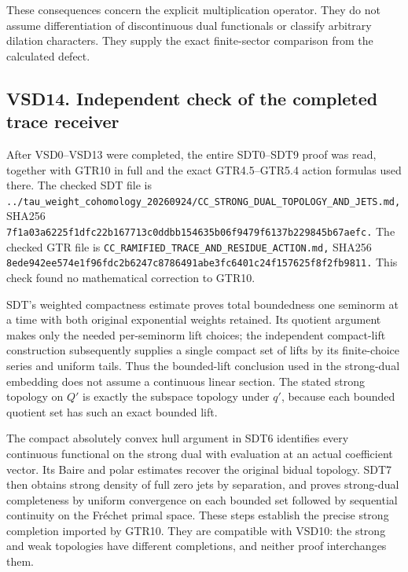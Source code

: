 These consequences concern the explicit multiplication operator. They do
not assume differentiation of discontinuous dual functionals or classify
arbitrary dilation characters. They supply the exact finite-sector
comparison from the calculated defect.

\subsection{VSD14. Independent check of the completed trace
receiver}\label{vsd14.-independent-check-of-the-completed-trace-receiver}

After VSD0--VSD13 were completed, the entire SDT0--SDT9 proof was read,
together with GTR10 in full and the exact GTR4.5--GTR5.4 action formulas
used there. The checked SDT file is
\nolinkurl{../tau_weight_cohomology_20260924/CC_STRONG_DUAL_TOPOLOGY_AND_JETS.md,}
SHA256
\nolinkurl{7f1a03a6225f1dfc22b167713c0ddbb154635b06f9479f6137b229845b67aefc.}
The checked GTR file is
\nolinkurl{CC_RAMIFIED_TRACE_AND_RESIDUE_ACTION.md,} SHA256
\nolinkurl{8ede942ee574e1f96fdc2b6247c8786491abe3fc6401c24f157625f8f2fb9811.}
This check found no mathematical correction to GTR10.

SDT's weighted compactness estimate proves total boundedness one
seminorm at a time with both original exponential weights retained. Its
quotient argument makes only the needed per-seminorm lift choices; the
independent compact-lift construction subsequently supplies a single
compact set of lifts by its finite-choice series and uniform tails. Thus
the bounded-lift conclusion used in the strong-dual embedding does not
assume a continuous linear section. The stated strong topology on \(Q'\)
is exactly the subspace topology under \(q'\), because each bounded
quotient set has such an exact bounded lift.

The compact absolutely convex hull argument in SDT6 identifies every
continuous functional on the strong dual with evaluation at an actual
coefficient vector. Its Baire and polar estimates recover the original
bidual topology. SDT7 then obtains strong density of full zero jets by
separation, and proves strong-dual completeness by uniform convergence
on each bounded set followed by sequential continuity on the Fréchet
primal space. These steps establish the precise strong completion
imported by GTR10. They are compatible with VSD10: the strong and weak
topologies have different completions, and neither proof interchanges
them.

